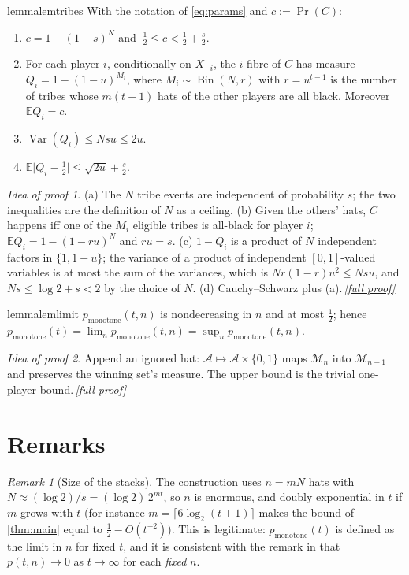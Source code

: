 \documentclass[11pt,a4paper]{article}
\theoremstyle{plain}
\theoremstyle{definition}
\theoremstyle{remark}
\newtheorem{remark}[theorem]{Remark}
\newtheorem*{proofidea}{Idea of proof}
\newcommand{\fullproofref}[1]{\,\hyperref[#1]{\textit{[full proof]}}}
\newcommand{\E}{\mathbb E}
\newcommand{\Prob}{\Pr}
\DeclareMathOperator{\Var}{Var}
\DeclareMathOperator{\Bin}{Bin}
\newcommand{\cA}{\mathcal A}
\newcommand{\cM}{\mathcal M}
\newcommand{\pmon}{p_{\mathrm{monotone}}}
\begin{document}
\begin{restatable}[Properties of $C$]{lemma}{lemtribes}\label{lem:tribes}
With the notation of \eqref{eq:params} and $c:=\Prob(C)$:
\begin{enumerate}[label=(\alph*),nosep]
\item $c=1-(1-s)^N$ and $\ \frac12\le c<\frac12+\frac s2$.
\item For each player $i$, conditionally on $X_{-i}$, the $i$-fibre of $C$ has measure $Q_i=1-(1-u)^{M_i}$, where $M_i\sim\Bin(N,r)$ with $r=u^{t-1}$ is the number of tribes whose $m(t-1)$ hats of the other players are all black. Moreover $\E Q_i=c$.
\item $\Var(Q_i)\le Nsu\le2u$.
\item $\E\bigl|Q_i-\frac12\bigr|\le\sqrt{2u}+\frac s2$.
\end{enumerate}
\end{restatable}
\begin{proofidea}
(a) The $N$ tribe events are independent of probability $s$; the two inequalities are the definition of $N$ as a ceiling. (b) Given the others' hats, $C$ happens iff one of the $M_i$ eligible tribes is all-black for player $i$; $\E Q_i=1-(1-ru)^N$ and $ru=s$. (c) $1-Q_i$ is a product of $N$ independent factors in $\{1,1-u\}$; the variance of a product of independent $[0,1]$-valued variables is at most the sum of the variances, which is $Nr(1-r)u^2\le Nsu$, and $Ns\le\log2+s<2$ by the choice of $N$. (d) Cauchy--Schwarz plus (a).\fullproofref{pf:tribes}
\end{proofidea}

\begin{restatable}{lemma}{lemlimit}\label{lem:limit}
$\pmon(t,n)$ is nondecreasing in $n$ and at most $\frac12$; hence $\pmon(t)=\lim_n\pmon(t,n)=\sup_n\pmon(t,n)$.
\end{restatable}
\begin{proofidea}
Append an ignored hat: $\cA\mapsto\cA\times\{0,1\}$ maps $\cM_n$ into $\cM_{n+1}$ and preserves the winning set's measure. The upper bound is the trivial one-player bound.\fullproofref{pf:limit}
\end{proofidea}

\section{Remarks}

\begin{remark}[Size of the stacks]
The construction uses $n=mN$ hats with $N\approx(\log2)/s=(\log2)\,2^{mt}$, so $n$ is enormous, and doubly exponential in $t$ if $m$ grows with $t$ (for instance $m=\lceil6\log_2(t+1)\rceil$ makes the bound of \cref{thm:main} equal to $\frac12-O(t^{-2})$). This is legitimate: $\pmon(t)$ is defined as the limit in $n$ for fixed $t$, and it is consistent with the remark in \cite{AFKK} that $p(t,n)\to0$ as $t\to\infty$ for each \emph{fixed} $n$.
\end{remark}
\end{document}
